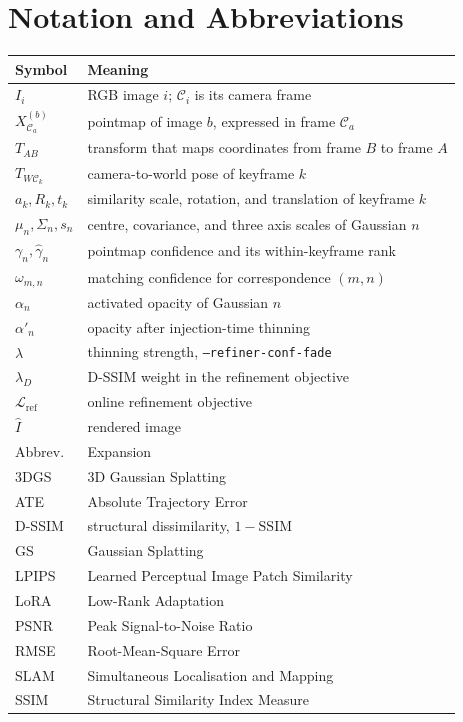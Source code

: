 \chapter*{Notation and Abbreviations}

\begin{center}
\begin{tabular}{@{}ll@{}}
\toprule
Symbol & Meaning \\
\midrule
$I_i$                  & RGB image $i$; $\mathcal C_i$ is its camera frame \\
$X_{\mathcal C_a}^{(b)}$ & pointmap of image $b$, expressed in frame $\mathcal C_a$ \\
$T_{AB}$               & transform that maps coordinates from frame $B$ to frame $A$ \\
$T_{W\mathcal C_k}$    & camera-to-world pose of keyframe $k$ \\
$a_k,R_k,t_k$          & similarity scale, rotation, and translation of keyframe $k$ \\
$\mu_n,\Sigma_n,s_n$   & centre, covariance, and three axis scales of Gaussian $n$ \\
$\gamma_n,\hat{\gamma}_n$ & pointmap confidence and its within-keyframe rank \\
$\omega_{m,n}$         & matching confidence for correspondence $(m,n)$ \\
$\alpha_n$             & activated opacity of Gaussian $n$ \\
$\alpha'_n$            & opacity after injection-time thinning \\
$\lambda$              & thinning strength, \texttt{--refiner-conf-fade} \\
$\lambda_D$            & D-SSIM weight in the refinement objective \\
$\mathcal{L}_{\text{ref}}$ & online refinement objective \\
$\hat{I}$              & rendered image \\
\midrule
Abbrev. & Expansion \\
\midrule
3DGS   & 3D Gaussian Splatting \\
ATE    & Absolute Trajectory Error \\
D-SSIM & structural dissimilarity, $1-\mathrm{SSIM}$ \\
GS     & Gaussian Splatting \\
LPIPS  & Learned Perceptual Image Patch Similarity \\
LoRA   & Low-Rank Adaptation \\
PSNR   & Peak Signal-to-Noise Ratio \\
RMSE   & Root-Mean-Square Error \\
SLAM   & Simultaneous Localisation and Mapping \\
SSIM   & Structural Similarity Index Measure \\
\bottomrule
\end{tabular}
\end{center}
